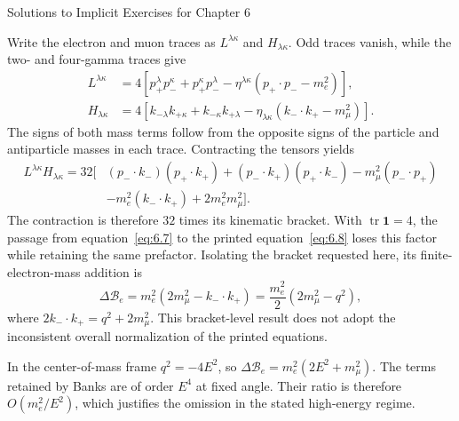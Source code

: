\begin{bankssolutions}{Solutions to Implicit Exercises for Chapter 6}

Write the electron and muon traces as \(L^{\lambda\kappa}\) and
\(H_{\lambda\kappa}\).  Odd traces vanish, while the two- and four-gamma
traces give
\begin{align*}
 L^{\lambda\kappa}
 &=4\left[p_+^\lambda p_-^\kappa+p_+^\kappa p_-^\lambda
 -\eta^{\lambda\kappa}(p_+\!\cdot p_--m_e^2)\right],\\
 H_{\lambda\kappa}
 &=4\left[k_{-\lambda}k_{+\kappa}+k_{-\kappa}k_{+\lambda}
 -\eta_{\lambda\kappa}(k_-\!\cdot k_+-m_\mu^2)\right].
\end{align*}
The signs of both mass terms follow from the opposite signs of the particle
and antiparticle masses in each trace.  Contracting the tensors yields
\begin{align*}
 L^{\lambda\kappa}H_{\lambda\kappa}=32\bigl[&
 (p_-\!\cdot k_-)(p_+\!\cdot k_+)
 +(p_-\!\cdot k_+)(p_+\!\cdot k_-)
 -m_\mu^2(p_-\!\cdot p_+)\\
 &-m_e^2(k_-\!\cdot k_+)+2m_e^2m_\mu^2\bigr].
\end{align*}
The contraction is therefore \(32\) times its kinematic bracket.  With
\(\operatorname{tr}\mathbf1=4\), the passage from equation~\eqref{eq:6.7}
to the printed equation~\eqref{eq:6.8} loses this factor while retaining the
same prefactor.  Isolating the bracket requested here, its finite-electron-mass
addition is
\begin{equation*}
 \Delta\mathcal B_e
 =m_e^2\left(2m_\mu^2-k_-\!\cdot k_+\right)
 =\frac{m_e^2}{2}\left(2m_\mu^2-q^2\right),
\end{equation*}
where \(2k_-\!\cdot k_+=q^2+2m_\mu^2\).  This bracket-level result does not
adopt the inconsistent overall normalization of the printed equations.

In the center-of-mass frame \(q^2=-4E^2\), so
\(\Delta\mathcal B_e=m_e^2(2E^2+m_\mu^2)\).  The terms retained by Banks
are of order \(E^4\) at fixed angle.  Their ratio is therefore
\(O(m_e^2/E^2)\), which justifies the omission in the stated high-energy
regime.


\end{bankssolutions}
